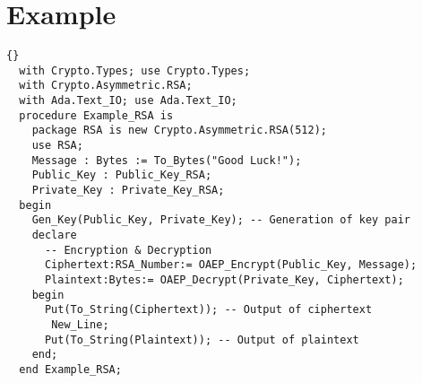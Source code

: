 \section{Example}
\begin{lstlisting}{}
  with Crypto.Types; use Crypto.Types;
  with Crypto.Asymmetric.RSA;
  with Ada.Text_IO; use Ada.Text_IO;
  procedure Example_RSA is
    package RSA is new Crypto.Asymmetric.RSA(512);
    use RSA;
    Message : Bytes := To_Bytes("Good Luck!");
    Public_Key : Public_Key_RSA;
    Private_Key : Private_Key_RSA;
  begin
    Gen_Key(Public_Key, Private_Key); -- Generation of key pair
    declare
      -- Encryption & Decryption
	  Ciphertext:RSA_Number:= OAEP_Encrypt(Public_Key, Message);
	  Plaintext:Bytes:= OAEP_Decrypt(Private_Key, Ciphertext);
    begin
      Put(To_String(Ciphertext)); -- Output of ciphertext
	   New_Line;
      Put(To_String(Plaintext)); -- Output of plaintext
    end;
  end Example_RSA;
\end{lstlisting}
